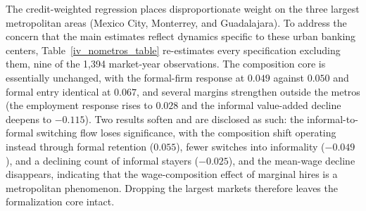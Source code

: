 \documentclass[12pt]{article}
\begin{document}
The credit-weighted regression places disproportionate weight on the three largest metropolitan areas (Mexico City, Monterrey, and Guadalajara). To address the concern that the main estimates reflect dynamics specific to these urban banking centers, Table~\ref{iv_nometros_table} re-estimates every specification excluding them, nine of the 1,394 market-year observations. The composition core is essentially unchanged, with the formal-firm response at $0.049$ against $0.050$ and formal entry identical at $0.067$, and several margins strengthen outside the metros (the employment response rises to $0.028$ and the informal value-added decline deepens to $-0.115$). Two results soften and are disclosed as such: the informal-to-formal switching flow loses significance, with the composition shift operating instead through formal retention ($0.055$), fewer switches into informality ($-0.049$), and a declining count of informal stayers ($-0.025$), and the mean-wage decline disappears, indicating that the wage-composition effect of marginal hires is a metropolitan phenomenon. Dropping the largest markets therefore leaves the formalization core intact.

\end{document}
